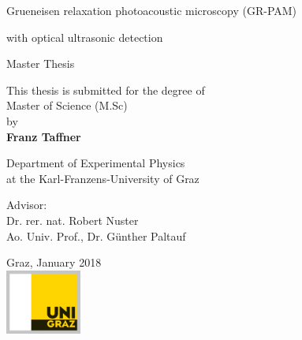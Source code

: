 \thispagestyle{empty}
\begin{center}

\vspace*{0.5cm}

\begin{huge}
\color{blue}

Grueneisen relaxation photoacoustic microscopy (GR-PAM)

\end{huge}

\vspace*{3mm}

\Large{with optical ultrasonic detection}

\vspace*{1.5cm}

\huge{Master Thesis}

\vspace*{1cm}

\large

This thesis is submitted for the degree of\\
Master of Science (M.Sc) \\
by\\
\vspace*{5mm}
\Large\textbf{Franz Taffner}\\

\vspace*{5mm}

Department of Experimental Physics \\
at the Karl-Franzens-University of Graz

\vspace*{2cm}

Advisor: \\
Dr. rer. nat. Robert Nuster\\
Ao. Univ. Prof., Dr. G\"unther Paltauf

\vspace*{1cm}

Graz, January 2018\\
\vspace*{0.5cm}
\includegraphics[width=2.5cm]{00_coverpage/images/logo_uni_graz_4c.jpg} \\

\end{center}
\newpage
\thispagestyle{empty}
